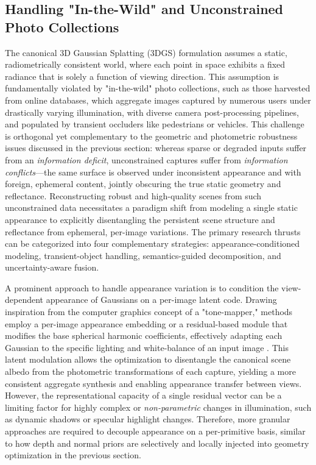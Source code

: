\documentclass[11pt,a4paper]{article}
\begin{document}
\subsection{Handling "In-the-Wild" and Unconstrained Photo Collections}


The canonical 3D Gaussian Splatting (3DGS) formulation assumes a static, radiometrically consistent world, where each point in space exhibits a fixed radiance that is solely a function of viewing direction. This assumption is fundamentally violated by "in-the-wild" photo collections, such as those harvested from online databases, which aggregate images captured by numerous users under drastically varying illumination, with diverse camera post-processing pipelines, and populated by transient occluders like pedestrians or vehicles. This challenge is orthogonal yet complementary to the geometric and photometric robustness issues discussed in the previous section: whereas sparse or degraded inputs suffer from an \emph{information deficit}, unconstrained captures suffer from \emph{information conflicts}---the same surface is observed under inconsistent appearance and with foreign, ephemeral content, jointly obscuring the true static geometry and reflectance. Reconstructing robust and high-quality scenes from such unconstrained data necessitates a paradigm shift from modeling a single static appearance to explicitly disentangling the persistent scene structure and reflectance from ephemeral, per-image variations. The primary research thrusts can be categorized into four complementary strategies: appearance-conditioned modeling, transient-object handling, semantics-guided decomposition, and uncertainty-aware fusion.

A prominent approach to handle appearance variation is to condition the view-dependent appearance of Gaussians on a per-image latent code. Drawing inspiration from the computer graphics concept of a "tone-mapper," methods employ a per-image appearance embedding or a residual-based module that modifies the base spherical harmonic coefficients, effectively adapting each Gaussian to the specific lighting and white-balance of an input image \cite{arxiv:2311.16037v1}. This latent modulation allows the optimization to disentangle the canonical scene albedo from the photometric transformations of each capture, yielding a more consistent aggregate synthesis and enabling appearance transfer between views. However, the representational capacity of a single residual vector can be a limiting factor for highly complex or \emph{non-parametric} changes in illumination, such as dynamic shadows or specular highlight changes. Therefore, more granular approaches are required to decouple appearance on a per-primitive basis, similar to how depth and normal priors are selectively and locally injected into geometry optimization in the previous section.
\end{document}
